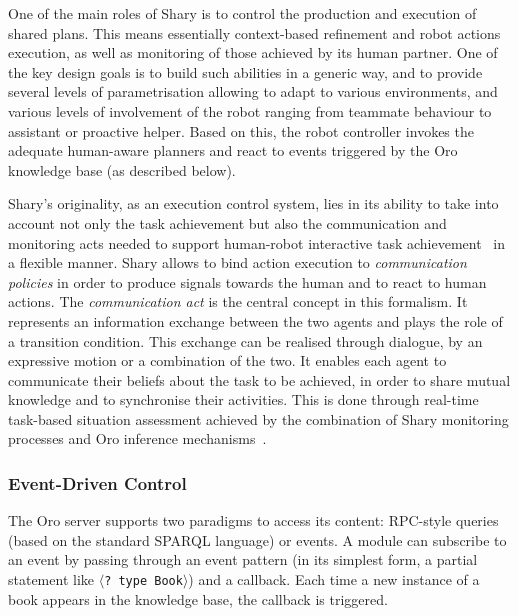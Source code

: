 \documentclass[preprint,3p,times]{elsarticle}
\newcommand{\stmt}[1]{{\footnotesize\tt$\langle$#1\relax$\rangle$}}
\begin{document}
One of the main roles of {\sc Shary} is to control the production and execution
of shared plans. This means essentially context-based refinement and robot
actions execution, as well as monitoring of those achieved by its human
partner. One of the key design goals is to build such abilities in a generic
way, and to provide several levels of parametrisation allowing to adapt to
various environments, and various levels of involvement of the robot ranging
from teammate behaviour to assistant or proactive helper. Based on this,
the robot controller invokes the adequate human-aware planners and react to
events triggered by the {\sc Oro} knowledge base (as described below).

{\sc Shary}'s originality, as an execution control system, lies in its ability
to take into account not only the task achievement but also the communication
and monitoring acts needed to support human-robot interactive task
achievement~\cite{Rich1997,Sidner2005} in a flexible manner. {\sc Shary} allows
to bind action execution to \emph{communication policies} in order to produce
signals towards the human and to react to human actions. The
\emph{communication act} is the central concept in this formalism. It
represents an information exchange between the two agents and plays the role of
a transition condition. This exchange can be realised through dialogue, by an
expressive motion or a combination of the two. It enables each agent to
communicate their beliefs about the task to be achieved, in order to share
mutual knowledge and to synchronise their activities.  This is done through
real-time task-based situation assessment achieved by the combination of {\sc
Shary} monitoring processes and {\sc Oro} inference
mechanisms~\cite{fiore2014}. 



\subsubsection{Event-Driven Control}
\label{events}

The {\sc Oro} server supports two paradigms to access its content: RPC-style
queries (based on the standard SPARQL language) or events. A module can
subscribe to an event by passing through an event pattern (in its simplest
form, a partial statement like \stmt{? type Book}) and a callback.  Each
time a new instance of a book appears in the knowledge base, the callback is
triggered.
\end{document}
